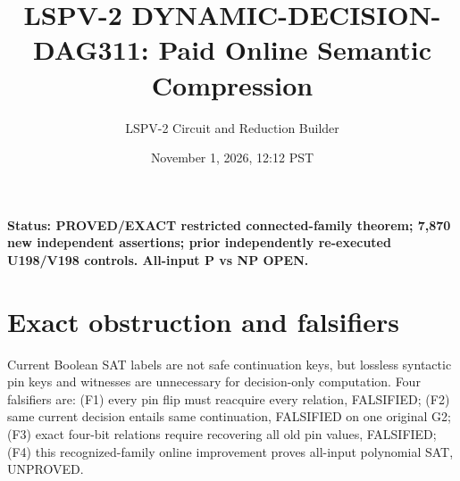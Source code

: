 \documentclass[11pt]{article}
\title{LSPV-2 DYNAMIC-DECISION-DAG311: Paid Online Semantic Compression}
\author{LSPV-2 Circuit and Reduction Builder}
\date{November 1, 2026, 12:12 PST}
\begin{document}
\maketitle
\noindent\textbf{Status: PROVED/EXACT restricted connected-family theorem; 7,870 new independent assertions; prior independently re-executed U198/V198 controls. All-input P vs NP OPEN.}
\section{Exact obstruction and falsifiers}
Current Boolean SAT labels are not safe continuation keys, but lossless syntactic pin keys and witnesses are unnecessary for decision-only computation. Four falsifiers are: (F1) every pin flip must reacquire every relation, FALSIFIED; (F2) same current decision entails same continuation, FALSIFIED on one original G2; (F3) exact four-bit relations require recovering all old pin values, FALSIFIED; (F4) this recognized-family online improvement proves all-input polynomial SAT, UNPROVED.
\end{document}
